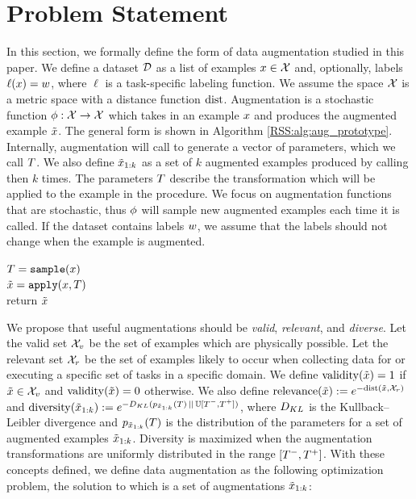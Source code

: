 \section{Problem Statement}  \label{RSS:sec:problem}

In this section, we formally define the form of data augmentation studied in this paper. We define a dataset $\mathcal{D}$ as a list of examples $x\in\mathcal{X}$ and, optionally, labels $\ell(x)=w$, where $\ell$ is a task-specific labeling function. We assume the space $\mathcal{X}$ is a metric space with a distance function $\mathrm{dist}$. Augmentation is a stochastic function $\phi:\mathcal{X}\rightarrow\mathcal{X}$ which takes in an example $x$ and produces the augmented example $\Tilde{x}$. The general form is shown in Algorithm \ref{RSS:alg:aug_prototype}. Internally, augmentation will call \sample{} to generate a vector of parameters, which we call $T$. We also define $\Tilde{x}_{1:k}$ as a set of $k$ augmented examples produced by calling \sample{} then \apply{} $k$ times. The parameters $T$ describe the transformation which will be applied to the example in the \apply{} procedure. We focus on augmentation functions that are stochastic, thus $\phi$ will sample new augmented examples each time it is called. If the dataset contains labels $w$, we assume that the labels should not change when the example is augmented.

\begin{algorithm}[t]
\caption{$\augf(x)$}\label{RSS:alg:aug_prototype}
$T = \texttt{sample}{}(x) $\\
$\Tilde{x} = \texttt{apply}(x,T)$\\
return $\Tilde{x}$\\
\end{algorithm}

We propose that useful augmentations should be \textit{valid}, \textit{relevant}, and \textit{diverse}. Let the valid set $\mathcal{X}_v$ be the set of examples which are physically possible. Let the relevant set $\mathcal{X}_r$ be the set of examples likely to occur when collecting data for or executing a specific set of tasks in a specific domain. We define $\mathrm{validity}(\Tilde{x})=1$ if $\Tilde{x} \in \mathcal{X}_v$ and $\mathrm{validity}(\Tilde{x})=0$ otherwise. We also define $\mathrm{relevance}(\Tilde{x}):=e^{-\mathrm{dist}(\Tilde{x},\mathcal{X}_r)}$ and $\mathrm{diversity}(\Tilde{x}_{1:k}):=e^{-D_{KL}({p_{\Tilde{x}_{1:k}}(T)}\,||\,{\mathbb{U}[T^-,T^+]})}$, where $D_{KL}$ is the Kullback–Leibler divergence and $p_{\Tilde{x}_{1:k}}(T)$ is the distribution of the parameters for a set of augmented examples $\Tilde{x}_{1:k}$. Diversity is maximized when the augmentation transformations are uniformly distributed in the range $[T^-,T^+]$. With these concepts defined, we define data augmentation as the following optimization problem, the solution to which is a set of augmentations $\Tilde{x}_{1:k}$:

